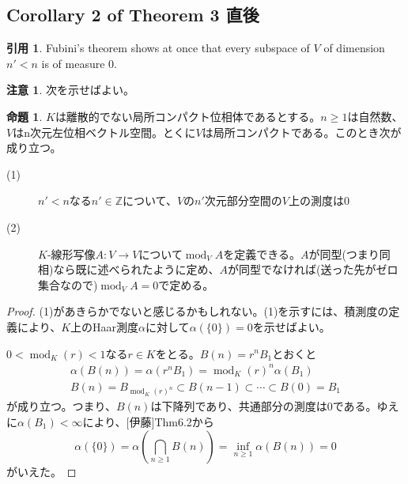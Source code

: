 \documentclass[12pt]{jsarticle}%
\renewenvironment{leftbar}{%
  \renewcommand\FrameCommand{\vrule width 1pt \hspace{10pt}}%
  \MakeFramed {\advance\hsize-\width \FrameRestore}}%
 {\endMakeFramed}
\newcommand{\barquo}[1]{\begin{leftbar} \begin{quo} #1 \end{quo} \end{leftbar}}%
\newcommand{\bfsubsection}[1]{\subsection*{\textbf{#1}}}
\theoremstyle{definition}%
\newtheorem*{proposition}{命題}
\newcommand{\prop}[1]{\begin{oframed} \begin{proposition} #1 \end{proposition} \end{oframed}}%
\newtheorem*{rem}{注意}
\newtheorem*{quo}{引用}
\DeclareMathOperator{\module}{mod}%
\newcommand{\bbz}{{\mathbb Z}}
\newcommand{\Z}{\bbz}
\begin{document}
\bfsubsection{Corollary 2 of Theorem 3 直後}
\barquo{
Fubini's theorem shows at once that every subspace of $V$ of dimension $n' < n$ is of measure $0$.
}
\begin{rem}
  次を示せばよい。
\end{rem}
\prop{
$K$は離散的でない局所コンパクト位相体であるとする。$n \geq 1$は自然数、$V$はn次元左位相ベクトル空間。とくに$V$は局所コンパクトである。このとき次が成り立つ。
\begin{description}
  \item[(1)]  $n' < n$なる$n' \in \Z$について、$V$の$n'$次元部分空間の$V$上の測度は0
  \item[(2)] $K$-線形写像$A \colon V \rightarrow V$について$\module_V A$を定義できる。$A$が同型(つまり同相)なら既に述べられたように定め、$A$が同型でなければ(送った先がゼロ集合なので)$\module_V A=0$で定める。
\end{description}
}

\begin{proof}
(1)があきらかでないと感じるかもしれない。(1)を示すには、積測度の定義により、$K$上のHaar測度$\alpha$に対して$\alpha(\{ 0 \})=0$を示せばよい。

$0 < \module_K (r) < 1$なる$r \in K$をとる。$B(n)=r^nB_1$とおくと
\begin{gather*}
\alpha(B(n))=\alpha(r^nB_1)=\module_K (r)^n \alpha(B_1) \\
B(n)=B_{\module_K (r)^n} \subset B(n-1) \subset \cdots \subset B(0)=B_1
\end{gather*}
が成り立つ。つまり、$B(n)$は下降列であり、共通部分の測度は0である。ゆえに$\alpha(B_1) < \infty$により、[伊藤]\cite{伊藤}Thm6.2から
\[
\alpha(\{ 0 \})=\alpha(\bigcap_{n \geq 1} B(n))= \inf_{n \geq 1}\alpha(B(n))=0
\]
がいえた。
\end{proof}
\end{document}
